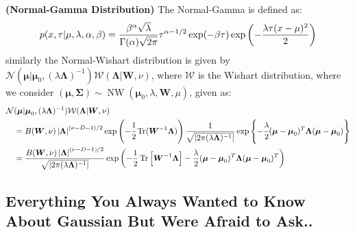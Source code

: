 \begin{definition}{\textbf{(Normal-Gamma Distribution)}}
    The Normal-Gamma is defined as:
    \begin{equation*}
        p(x, \tau | \mu,\lambda,\alpha,\beta) = \frac{\beta^\alpha\sqrt{\lambda}}{\Gamma(\alpha)\sqrt{2\pi}} \tau^{\alpha-1/2}\exp(-\beta\tau)\exp\left( -\frac{\lambda\tau(x-\mu)^2}{2} \right)
    \end{equation*}
    similarly the Normal-Wishart distribution is given by $\mathcal{N}(\boldsymbol \mu | \boldsymbol \mu_0, (\lambda\boldsymbol \Lambda)^{-1})\mathcal{W}(\boldsymbol \Lambda | \boldsymbol W, \nu)$, where $\mathcal{W}$ is the Wishart distribution, where we consider $(\boldsymbol \mu, \boldsymbol \Sigma) \sim \operatorname{NW}(\boldsymbol \mu_0, \lambda, \boldsymbol W, \mu)$, given as:
    \begin{equation*}
    \begin{aligned}
        \mathcal{N}&(\boldsymbol \mu | \boldsymbol \mu_0, (\lambda\boldsymbol \Lambda)^{-1})\mathcal{W}(\boldsymbol \Lambda | \boldsymbol W, \nu) \\
        &= B(\boldsymbol W, \nu)\left| \boldsymbol \Lambda \right|^{(\nu-D-1)/2}\exp\left( -\cfrac{1}{2}\operatorname{Tr}(\boldsymbol W^{-1}\boldsymbol \Lambda) \right) \frac{1}{\sqrt{\left| 2\pi (\lambda\boldsymbol \Lambda)^{-1} \right|}} \exp\left\{ -\cfrac{\lambda}{2}(\boldsymbol \mu-\boldsymbol \mu_0)^T\boldsymbol \Lambda(\boldsymbol \mu-\boldsymbol \mu_0) \right\} \\
        &= \frac{B(\boldsymbol W, \nu)\left| \boldsymbol \Lambda \right|^{(\nu-D-1)/2}}{\sqrt{\left| 2\pi (\lambda\boldsymbol \Lambda)^{-1} \right|}}\exp\left( -\frac{1}{2}\operatorname{Tr}\Big[\boldsymbol W^{-1}\boldsymbol \Lambda \Big] - \frac{\lambda}{2} (\boldsymbol \mu-\boldsymbol \mu_0)^T\boldsymbol \Lambda (\boldsymbol \mu-\boldsymbol \mu_0)^T \right) \\
    \end{aligned}
    \end{equation*}
\end{definition}

\subsection{Everything You Always Wanted to Know About Gaussian But Were Afraid to Ask..}

